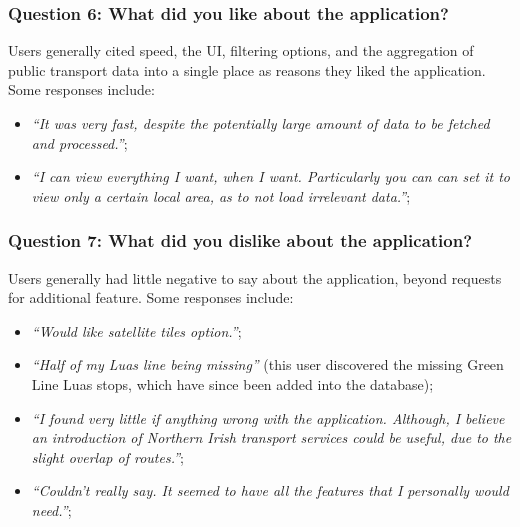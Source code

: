 \documentclass[a4paper,11pt]{report}
\begin{document}
\subsubsection{Question 6: What did you like about the application?}
Users generally cited speed, the UI, filtering options, and the aggregation of public transport data into a single place as reasons they liked the application.
Some responses include:
\begin{itemize}
    \item   \textit{``It was very fast, despite the potentially large amount of data to be fetched and processed.''};
    \item   \textit{``I can view everything I want, when I want. Particularly you can can set it to view only a certain local area, as to not load irrelevant data.''};
\end{itemize}

\subsubsection{Question 7: What did you dislike about the application?}
Users generally had little negative to say about the application, beyond requests for additional feature.
Some responses include:
\begin{itemize}
    \item   \textit{``Would like satellite tiles option.''};
    \item   \textit{``Half of my Luas line being missing''} (this user discovered the missing Green Line Luas stops, which have since been added into the database);
    \item   \textit{``I found very little if anything wrong with the application. Although, I believe an introduction of Northern Irish transport services could be useful, due to the slight overlap of routes.''};
    \item   \textit{``Couldn't really say. It seemed to have all the features that I personally would need.''};
\end{itemize}
\end{document}
